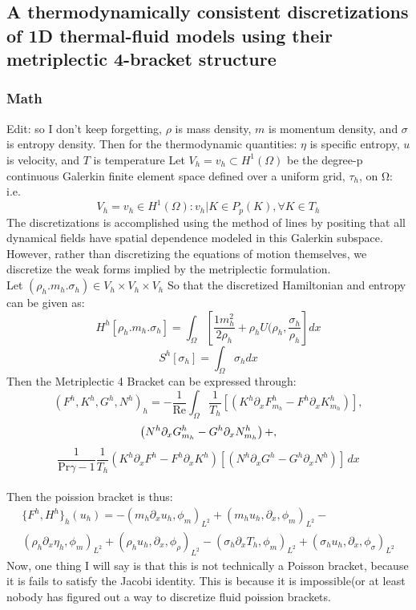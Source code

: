 \subsection{A thermodynamically consistent discretizations of 1D thermal-fluid
models using their metriplectic 4-bracket structure}
\subsubsection{Math}
Edit: so I don't keep forgetting, $\rho$ is mass density, $m$ is momentum density, and $\sigma$ is entropy density. Then for the thermodynamic quantities: $\eta$ is specific entropy, $u$ is velocity, and $T$ is temperature 
 Let $V_h = v_h \subset H^1(\Omega)$ be the degree-p continuous
 Galerkin finite element space defined over a uniform grid, $\tau_h $, on Ω: i.e.
 $$V_h = {v_h  \in H^1(\Omega) : v_h|K \in P_p(K), \forall K \in T_h}$$
  The discretizations is accomplished
 using the method of lines by positing that all dynamical fields have spatial dependence modeled
 in this Galerkin subspace. However, rather than discretizing the equations of motion themselves,
 we discretize the weak forms implied by the metriplectic formulation.
\\
 Let $(\rho_h. m_h. \sigma_h) \in V_h \times V_h \times V_h$
 So that the discretized Hamiltonian and entropy can be given as:
 $$H^h[\rho_h. m_h. \sigma_h]= \int_\Omega [\frac{1m^2_h}{2 \rho_h}+\rho_h U (\rho_h, \frac{\sigma_h}{\rho_h}]dx$$
 $$S^h[\sigma_h]=\int_\Omega \sigma_h dx$$
 Then the Metriplectic 4 Bracket can be expressed through:
 $$(F^h, K^h, G^h, N^h)_h = -\frac{1}{\text{Re}} \int_{\Omega} \frac{1}{T_h} \left[ \left( K^h \partial_x F^h_{m_h} - F^h \partial_x K^h_{m_h} \right) \right], $$
 $$\left( N^h \partial_x G^h_{m_h} - G^h \partial_x N^h_{m_h} \right)  \\
 +, $$
$$ \frac{1}{\text{Pr} \gamma - 1} \frac{1}{T_h} \left( K^h \partial_x F^h - F^h \partial_x K^h \right) \left[ \left( N^h \partial_x G^h - G^h \partial_x N^h \right) \right] \, dx $$
\\
Then the poission bracket is thus:
\begin{align*}
\{F^h, H^h\}_h(u_h)= - (m_h \partial_x u_h, \phi_m)_{L^2} + (m_h u_h, \partial_x , \phi_m)_{L^2} - \\ (\rho_h \partial_x \eta_h, \phi_m)_{L^2}  + (\rho_h u_h, \partial_x , \phi_\rho)_{L^2} - (\sigma_h\partial_x T_h, \phi_m)_{L^2} + (\sigma_h u_h, \partial_x, \phi_\sigma)_{L^2}
\end{align*}
Now, one thing I will say is that this is not technically a Poisson bracket, because it is fails to satisfy the Jacobi identity. This is because it is impossible(or at least nobody has figured out a way to discretize fluid poission brackets.

